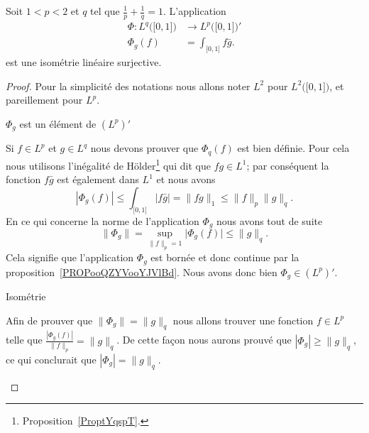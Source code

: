 \begin{proposition} \label{PropOAVooYZSodR}
    Soit \( 1<p<2\) et \( q\) tel que \( \frac{1}{ p }+\frac{1}{ q }=1\). L'application
    \begin{equation}
        \begin{aligned}
            \Phi\colon L^q\big( \mathopen[ 0 , 1 \mathclose] \big)&\to  L^p\big( \mathopen[ 0 , 1 \mathclose] \big)'  \\
            \Phi_g(f)&= \int_{\mathopen[ 0 , 1 \mathclose]}f\bar g.
        \end{aligned}
    \end{equation}
    est une isométrie linéaire surjective.
\end{proposition}

\begin{proof}
    Pour la simplicité des notations nous allons noter \( L^2\) pour \( L^2\big( \mathopen[ 0 , 1 \mathclose] \big)\), et pareillement pour \( L^p\).
    \begin{subproof}
        \item[\( \Phi_g\) est un élément de \( (L^p)'\)]

            Si \( f\in L^p\) et \( g\in L^q\) nous devons prouver que \( \Phi_q(f)\) est bien définie. Pour cela nous utilisons l'inégalité de Hölder\footnote{Proposition~\ref{ProptYqspT}.} qui dit que \( fg\in L^1\); par conséquent la fonction \( f\bar g\) est également dans \( L^1\) et nous avons
            \begin{equation}
                | \Phi_g(f) |\leq\int_{\mathopen[ 0 , 1 \mathclose]}| f\bar g |=\| fg \|_1\leq \| f \|_p\| g \|_q.
            \end{equation}
            En ce qui concerne la norme de l'application \( \Phi_g\) nous avons tout de suite
            \begin{equation}
                \| \Phi_g \|=\sup_{\| f\|_p=1}\big| \Phi_g(f) \big|\leq \| g \|_q.
            \end{equation}
            Cela signifie que l'application \( \Phi_g\) est bornée et donc continue par la proposition~\ref{PROPooQZYVooYJVlBd}. Nous avons donc bien \( \Phi_g\in (L^p)'\).

        \item[Isométrie]

            Afin de prouver que \( \| \Phi_g \|=\| g \|_q\) nous allons trouver une fonction \( f\in L^p\) telle que \( \frac{ | \Phi_g(f) | }{ \| f \|_p }=\| g \|_q\).  De cette façon nous aurons prouvé que \( | \Phi_g |\geq \| g \|_q\), ce qui conclurait que \( | \Phi_g |=\| g \|_q\).


\end{subproof}
\end{proof}
